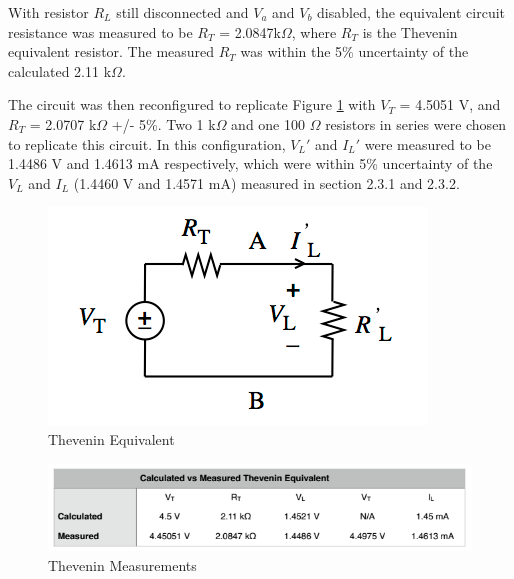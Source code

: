\documentclass[12pt]{article}
\begin{document}
With resistor $R_{L}$ still disconnected and $V_{a}$ and $V_{b}$ disabled, the equivalent circuit resistance was measured to be $R_{T}$ = 2.0847k$\Omega$, where $R_{T}$ is the Thevenin equivalent resistor. The measured $R_{T}$ was within the 5\% uncertainty of the calculated 2.11 k$\Omega$.

The circuit was then reconfigured to replicate Figure \ref{fig.Thevenin} with $V_{T}$ = 4.5051 V, and $R_{T}$ = 2.0707 k$\Omega$ +/- 5\%. Two 1 k$\Omega$ and one 100 $\Omega$  resistors in series were chosen to replicate this circuit. In this configuration, $V_{L}\prime$ and $I_{L}\prime$ were measured to be 1.4486 V and 1.4613 mA respectively, which were within 5\% uncertainty of the $V_{L}$ and $I_{L}$ (1.4460 V and 1.4571 mA) measured in section 2.3.1 and 2.3.2.
\begin{figure}[htbp]
	\centering
	\includegraphics[scale=.65]{Thevenin.png}
	\caption{Thevenin Equivalent}
	\label{fig.Thevenin}
\end{figure}
\begin{figure}[htbp]
	\centering
	\includegraphics[scale=1]{TheveninMeasurement.png}
	\caption{Thevenin Measurements}
	\label{fig.TheveninMeasure}
\end{figure}
\pagebreak
\end{document}
